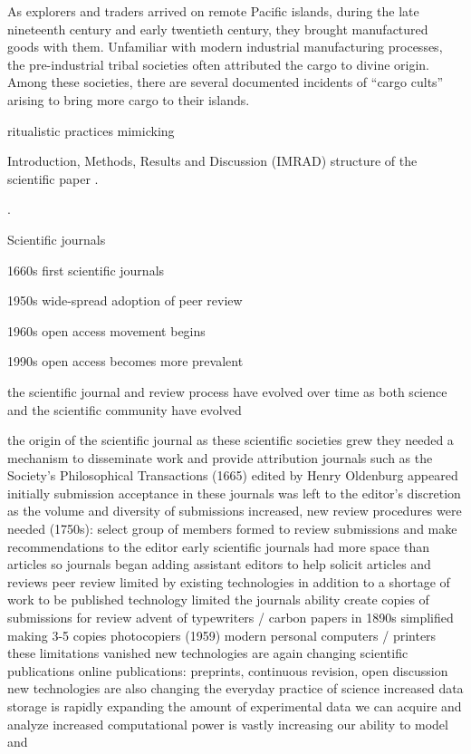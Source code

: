 \documentclass[ChapterTOCs,krantz2]{krantz} %
\begin{document}

As explorers and traders arrived on remote Pacific islands, during the
late nineteenth century and early twentieth century, they brought manufactured
goods with them.  Unfamiliar with modern industrial manufacturing processes, the
pre-industrial tribal societies often attributed the cargo to divine origin.
Among these societies, there are several documented incidents of ``cargo cults''
arising to bring more cargo to their islands.

ritualistic practices mimicking 

Introduction, Methods, Results and Discussion (IMRAD) structure of the
scientific paper \cite{sollaci2004introduction,spier2002history}.
 
\cite{medawar1963scientific}.


Scientific journals

1660s  first scientific journals

1950s  wide-spread adoption of peer review

1960s  open access movement begins

1990s  open access becomes more prevalent

the scientific journal and review process have evolved over time as both science and the scientific community have evolved

    the origin of the scientific journal
        as these scientific societies grew they needed a mechanism to disseminate work and provide attribution
        journals such as the Society's Philosophical Transactions (1665) edited by Henry Oldenburg appeared
        initially submission acceptance in these journals was left to the editor's discretion
        as the volume and diversity of submissions increased, new review procedures were needed
            (1750s): select group of members formed to review submissions and make recommendations to the editor
        early scientific journals had more space than articles so journals began adding assistant editors to help solicit articles and reviews
    peer review limited by existing technologies
        in addition to a shortage of work to be published technology limited the journals ability create copies of submissions for review
            advent of typewriters / carbon papers in 1890s simplified making 3-5 copies
            photocopiers (1959)
            modern personal computers / printers these limitations vanished
    new technologies are again changing scientific publications
        online publications: preprints, continuous revision, open discussion
    new technologies are also changing the everyday practice of science
        increased data storage is rapidly expanding the amount of experimental data we can acquire and analyze
        increased computational power is vastly increasing our ability to model and
\end{document}

